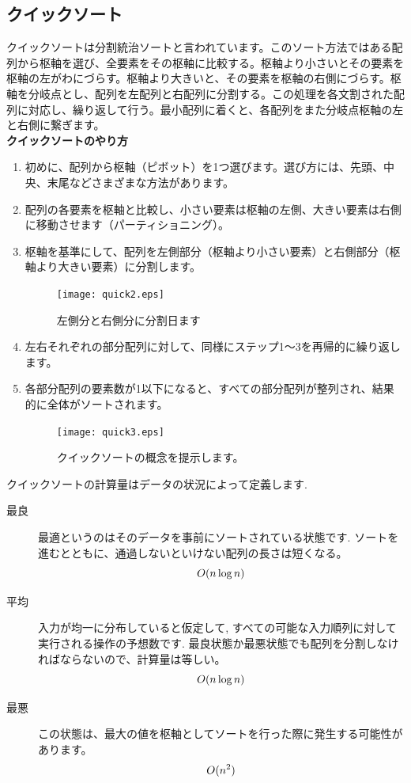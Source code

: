 \documentclass[a4j]{jarticle}
\begin{document}
\subsection{クイックソート}
クイックソートは分割統治ソートと言われています。このソート方法ではある配列から枢軸を選び、全要素をその枢軸に比較する。枢軸より小さいとその要素を枢軸の左がわにづらす。枢軸より大きいと、その要素を枢軸の右側にづらす。枢軸を分岐点とし、配列を左配列と右配列に分割する。この処理を各文割された配列に対応し、繰り返して行う。最小配列に着くと、各配列をまた分岐点枢軸の左と右側に繋ぎます。\\
\textbf{クイックソートのやり方}
\begin{enumerate}
  \item 初めに、配列から枢軸（ピボット）を1つ選びます。選び方には、先頭、中央、末尾などさまざまな方法があります。
  \item 配列の各要素を枢軸と比較し、小さい要素は枢軸の左側、大きい要素は右側に移動させます（パーティショニング）。
  \item 枢軸を基準にして、配列を左側部分（枢軸より小さい要素）と右側部分（枢軸より大きい要素）に分割します。
  \begin{figure}[H]
    \centering
    \texttt{[image: quick2.eps]}
    \caption{左側分と右側分に分割日ます}
  \end{figure}
  \newpage
  \item 左右それぞれの部分配列に対して、同様にステップ1～3を再帰的に繰り返します。
  \item 各部分配列の要素数が1以下になると、すべての部分配列が整列され、結果的に全体がソートされます。
  \begin{figure}[H]
    \centering
    \texttt{[image: quick3.eps]}
    \caption{クイックソートの概念を提示します。}
  \end{figure}
\end{enumerate}
クイックソートの計算量はデータの状況によって定義します. \\
\begin{description}
  \item[最良] 最適というのはそのデータを事前にソートされている状態です. ソートを進むとともに、通過しないといけない配列の長さは短くなる。
  \begin{equation}
    \centering
    O(n\log n)
  \end{equation}
  \item[平均] 入力が均一に分布していると仮定して, すべての可能な入力順列に対して実行される操作の予想数です. 最良状態か最悪状態でも配列を分割しなければならないので、計算量は等しい。
  \begin{equation}
    \centering
    O(n\log n)
  \end{equation}
  \item[最悪] この状態は、最大の値を枢軸としてソートを行った際に発生する可能性があります。
  \begin{equation}
    \centering
    O(n^2)
  \end{equation}
\end{description}
\end{document}
